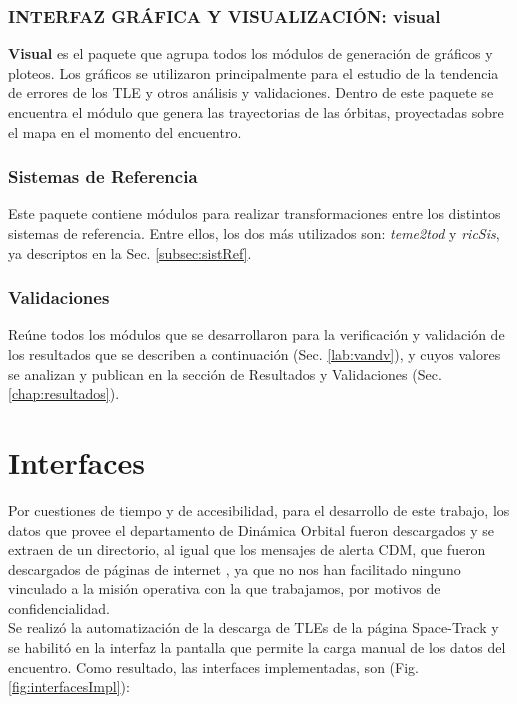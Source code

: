 \subsubsection*{INTERFAZ GR\'AFICA Y VISUALIZACI\'ON: visual}
{\bf{Visual}} es el paquete que agrupa todos los m\'odulos de generaci\'on de gr\'aficos y ploteos. Los gr\'aficos se utilizaron principalmente para el estudio de la tendencia de errores de los TLE y otros an\'alisis y validaciones.
Dentro de este paquete se encuentra el m\'odulo que genera las trayectorias de las \'orbitas, proyectadas sobre el mapa en el momento del encuentro.\\

\subsubsection*{Sistemas de Referencia}
Este paquete contiene m\'odulos para realizar transformaciones entre los distintos sistemas de referencia. Entre ellos, los dos m\'as utilizados son:
{\it{teme2tod}} y {\it{ricSis}}, ya descriptos en la Sec. \ref{subsec:sistRef}.

\subsubsection*{Validaciones}
Re\'une todos los m\'odulos que se desarrollaron para la verificaci\'on y validaci\'on de los resultados que se describen a continuaci\'on (Sec. \ref{lab:vandv}), y cuyos valores se analizan y publican en la secci\'on de Resultados y Validaciones (Sec. \ref{chap:resultados}).

\section{Interfaces}
Por cuestiones de tiempo y de accesibilidad, para el desarrollo de este trabajo, los datos que provee el departamento de Din\'amica Orbital fueron descargados y se extraen de un directorio, al igual que los mensajes de alerta CDM, que fueron descargados de p\'aginas de internet , ya que no nos han facilitado ninguno vinculado a la misi\'on operativa con la que trabajamos, por motivos de confidencialidad.\\

Se realiz\'o la automatizaci\'on de la descarga de TLEs de la p\'agina Space-Track y se habilit\'o en la interfaz la pantalla que permite la carga manual de los datos del encuentro. Como resultado, las interfaces implementadas, son (Fig. \ref{fig:interfacesImpl}):
 
